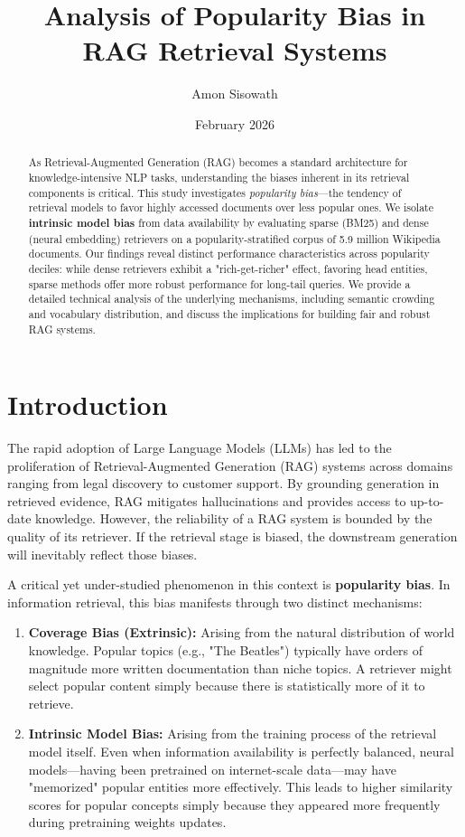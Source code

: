 \documentclass{article}
\title{Analysis of Popularity Bias in RAG Retrieval Systems}
\author{Amon Sisowath}
\date{February 2026}
\begin{document}
\maketitle

\begin{abstract}
As Retrieval-Augmented Generation (RAG) becomes a standard architecture for knowledge-intensive NLP tasks, understanding the biases inherent in its retrieval components is critical. This study investigates \textit{popularity bias}—the tendency of retrieval models to favor highly accessed documents over less popular ones. We isolate \textbf{intrinsic model bias} from data availability by evaluating sparse (BM25) and dense (neural embedding) retrievers on a popularity-stratified corpus of 5.9 million Wikipedia documents. Our findings reveal distinct performance characteristics across popularity deciles: while dense retrievers exhibit a "rich-get-richer" effect, favoring head entities, sparse methods offer more robust performance for long-tail queries. We provide a detailed technical analysis of the underlying mechanisms, including semantic crowding and vocabulary distribution, and discuss the implications for building fair and robust RAG systems.
\end{abstract}

\section{Introduction}

The rapid adoption of Large Language Models (LLMs) has led to the proliferation of Retrieval-Augmented Generation (RAG) systems across domains ranging from legal discovery to customer support. By grounding generation in retrieved evidence, RAG mitigates hallucinations and provides access to up-to-date knowledge. However, the reliability of a RAG system is bounded by the quality of its retriever. If the retrieval stage is biased, the downstream generation will inevitably reflect those biases.

A critical yet under-studied phenomenon in this context is \textbf{popularity bias}. In information retrieval, this bias manifests through two distinct mechanisms:

\begin{enumerate}
    \item \textbf{Coverage Bias (Extrinsic):} Arising from the natural distribution of world knowledge. Popular topics (e.g., "The Beatles") typically have orders of magnitude more written documentation than niche topics. A retriever might select popular content simply because there is statistically more of it to retrieve.
    \item \textbf{Intrinsic Model Bias:} Arising from the training process of the retrieval model itself. Even when information availability is perfectly balanced, neural models—having been pretrained on internet-scale data—may have "memorized" popular entities more effectively. This leads to higher similarity scores for popular concepts simply because they appeared more frequently during pretraining weights updates.
\end{enumerate}
\end{document}
